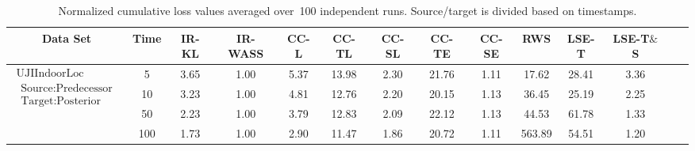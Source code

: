 \documentclass{article}
\begin{document}






\begin{table*}[h!]
    \centering
    \footnotesize
    \vspace{-.3cm}
    \begin{tabular}{||c|c|c|c|c|c|c|c|c|c|c|c|c|c||}
    \hline
    \hline
    Data Set&Time &IR-KL &IR-WASS & CC-L &CC-TL &CC-SL & CC-TE &CC-SE &RWS &LSE-T &LSE-T$\&$S \\
    \hline
    \hline
    \multirow{4}{*}{$\substack{\text{UJIIndoorLoc}\\[.7ex] {\substack{ \text{Source:Predecessor} \\\text{Target:Posterior}}}}$} 
    &5 &3.65  &{1.00} &5.37  &13.98  &2.30  &21.76  &{1.11}  &17.62 &28.41  &3.36 \\
    &10 &3.23 &{1.00} &4.81 &12.76 &2.20 &20.15 &{1.13} &36.45 &25.19 &2.25\\
    &50 &2.23 &{1.00}	&3.79 &12.83 &2.09 &22.12 &{1.13} &44.53 &61.78 &1.33\\
    &100 &1.73 &{1.00}	&2.90 &11.47 &1.86 &20.72 &{1.11} &563.89 &54.51 &1.20 \\
    \hline
    \hline
    \end{tabular} 
    \vspace{-.3cm}
    \caption{Normalized cumulative loss values averaged over~100 independent runs. Source/target is divided based on timestamps.}
    \vspace{-5mm}
    \label{table:rebuttal}
\end{table*}
\end{document}

